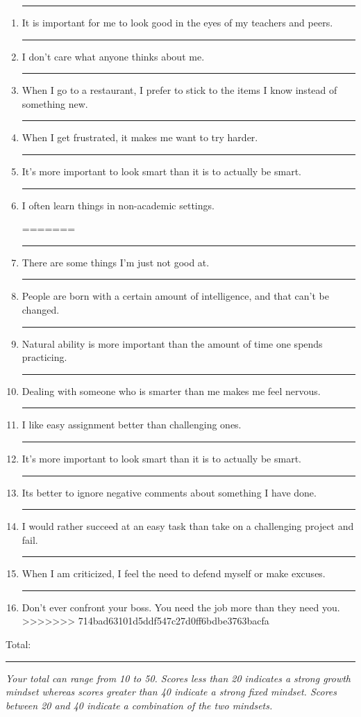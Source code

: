 \documentclass[letterpaper, 11pt]{article}
\begin{document}
\begin{enumerate}
	\item \rule{.5in}{.01in} It is important for me to look good in the eyes of my teachers and peers.
	
	\item \rule{.5in}{.01in} I don't care what anyone thinks about me.
	
	\item \rule{.5in}{.01in} When I go to a restaurant, I prefer to stick to the items I know instead of something new. 
	
	\item \rule{.5in}{.01in} When I get frustrated, it makes me want to try harder.
	
	\item \rule{.5in}{.01in} It's more important to look smart than it is to actually be smart.
	
	\item \rule{.5in}{.01in} I often learn things in non-academic settings.
	
	
	
	
	
	
	
	


=======
	\item \rule{.5in}{.01in} There are some things I'm just not good at.
	\item \rule{.5in}{.01in} People are born with a certain amount of intelligence, and that can't be changed.
	\item \rule{.5in}{.01in} Natural ability is more important than the amount of time one spends practicing.
	\item \rule{.5in}{.01in} Dealing with someone who is smarter than me makes me feel nervous.
	\item \rule{.5in}{.01in} I like easy assignment better than challenging ones.
	\item \rule{.5in}{.01in} It's more important to look smart than it is to actually be smart.
	\item \rule{.5in}{.01in} Its better to ignore negative comments about something I have done.
	\item \rule{.5in}{.01in} I would rather succeed at an easy task than take on a challenging project and fail.
	\item \rule{.5in}{.01in} When I am criticized, I feel the need to defend myself or make excuses.
	\item \rule{.5in}{.01in} Don't ever confront your boss.  You need the job more than they need you.
>>>>>>> 714bad63101d5ddf547c27d0ff6bdbe3763bacfa
	
\end{enumerate}
 
Total: \rule{.5in}{.01in}
\vspace{.5in}

\textit{Your total can range from 10 to 50.  Scores less than 20 indicates a strong growth mindset whereas scores greater than 40 indicate a strong fixed mindset. Scores between 20 and 40 indicate a combination of the two mindsets.}
\end{document}
